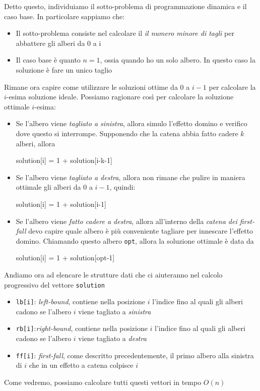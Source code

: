 Detto questo, individuiamo il sotto-problema di programmazione dinamica e il caso base. In particolare sappiamo che:
\begin{itemize}
	\item Il sotto-problema consiste nel calcolare il \textit{il numero minore di tagli} per abbattere gli alberi da 0 a i
	\item Il caso base è quanto $ n=1 $, ossia quando ho un solo albero. In questo caso la soluzione è fare un unico taglio
\end{itemize}
\hypertarget{taglialegna solution steps}{}Rimane ora capire come utilizzare le soluzioni ottime da 0 a $ i-1 $ per calcolare la $ i $-esima soluzione ideale. Possiamo ragionare così per calcolare la soluzione ottimale $ i $-esima:
\begin{itemize}
	\item Se l'albero viene \textit{tagliato a sinistra}, allora simulo l'effetto domino e verifico dove questo si interrompe. Supponendo che la catena abbia fatto cadere $ k $ alberi, allora
	      \begin{center}
		      \ttfamily
		      solution[i] = 1 + solution[i-k-1]
	      \end{center}
	\item Se l'albero viene \textit{tagliato a destra}, allora non rimane che pulire in maniera ottimale gli alberi da 0 a $ i-1 $, quindi:
	      \begin{center}
		      \ttfamily
		      solution[i] = 1 + solution[i-1]
	      \end{center}
	\item Se l'albero viene \textit{fatto cadere a destra}, allora all'interno della \textit{catena dei first-fall} devo capire quale albero è più conveniente tagliare per innescare l'effetto domino. Chiamando questo albero \verb|opt|, allora la soluzione ottimale è data da
	      \begin{center}
		      \ttfamily
		      solution[i] = 1 + solution[opt-1]
	      \end{center}
\end{itemize}
Andiamo ora ad elencare le strutture dati che ci aiuteranno nel calcolo progressivo del vettore \verb|solution|
\begin{itemize}
	\item \verb|lb[i]|: \textit{left-bound}, contiene nella posizione $ i $ l'indice fino al quali gli alberi cadono se l'albero $ i $ viene tagliato a \textit{sinistra}
	\item \verb|rb[i]|:\textit{right-bound}, contiene nella posizione $ i $ l'indice fino al quali gli alberi cadono se l'albero $ i $ viene tagliato a \textit{destra}
	\item \verb|ff[i]|: \textit{first-fall}, come descritto precedentemente, il primo albero alla sinistra di $ i $ che in un effetto a catena colpisce $ i $
\end{itemize}
\hypertarget{taglialegna dp data}{}Come vedremo, possiamo calcolare tutti questi vettori in tempo $ O\left(n\right) $

